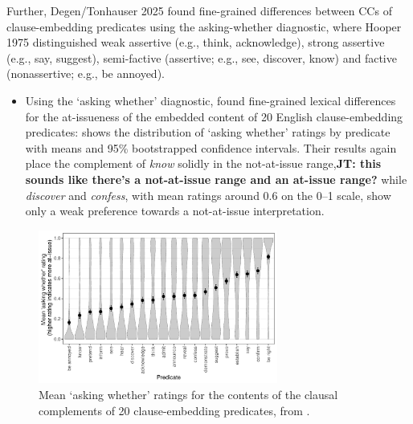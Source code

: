 \documentclass[times,linguex,xcolor]{glossa}
\newcommand{\jt}[1]{\textbf{\color{orange}JT: #1}}
\begin{document}
  Further, Degen/Tonhauser 2025 found fine-grained differences between CCs of clause-embedding predicates using the asking-whether diagnostic, where Hooper 1975 distinguished weak assertive (e.g., think, acknowledge), strong assertive (e.g., say, suggest), semi-factive (assertive; e.g., see, discover, know) and factive (nonassertive; e.g., be annoyed).

  \begin{itemize}
    \item Using the `asking whether' diagnostic, \citealt{degen-tonhauser-glossa} found fine-grained lexical differences for the at-issueness of the embedded content of 20 English clause-embedding predicates:  shows the distribution of `asking whether' ratings by predicate with means and 95\% bootstrapped confidence intervals. Their results again place the complement of \emph{know} solidly in the not-at-issue range,\jt{this sounds like there's a not-at-issue range and an at-issue range?} while \emph{discover} and \emph{confess}, with mean ratings around $0.6$ on the 0--1 scale, show only a weak preference towards a not-at-issue interpretation.

  \end{itemize}

  
  \begin{figure}[h!]
    \centering

    \includegraphics[width=0.7\textwidth]{../../results/degen-tonhauser-glossa/graphs/mean-asking-whether-ratings.pdf}

    \caption{Mean `asking whether' ratings for the contents of the clausal complements of 20 clause-embedding predicates, from \citealt{degen-tonhauser-glossa}.}
    \label{fig:dtglossa}
  \end{figure}
  
\end{document}
